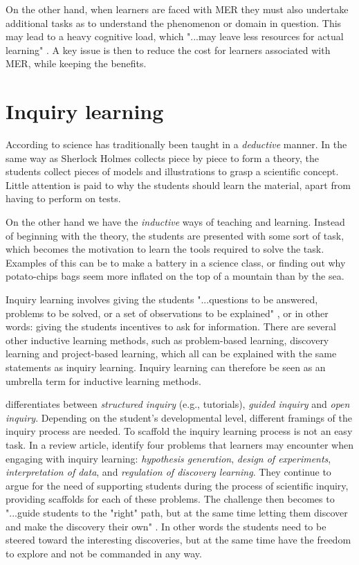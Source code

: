 On the other hand, when learners are faced with MER they must also undertake additional tasks as to understand the phenomenon or domain in question. This may lead to a heavy cognitive load, which "...may leave less resources for actual learning" \citetext{\citealp{sweller1988cognitive,sweller1989cognitive}, referenced in \citealp{van2006supporting}}. A key issue is then to reduce the cost for learners associated with MER, while keeping the benefits. 

\section{Inquiry learning}
According to \citet{prince2006inductive} science has traditionally been taught in a \textit{deductive} manner. In the same way as Sherlock Holmes collects piece by piece to form a theory, the students collect pieces of models and illustrations to grasp a scientific concept. Little attention is paid to why the students should learn the material, apart from having to perform on tests.

On the other hand we have the \textit{inductive} ways of teaching and learning. Instead of beginning with the theory, the students are presented with some sort of task, which becomes the motivation to learn the tools required to solve the task. Examples of this can be to make a battery in a science class, or finding out why potato-chips bags seem more inflated on the top of a mountain than by the sea.

Inquiry learning involves giving the students "...questions to be answered, problems to be solved, or a set of observations to be explained" \citep{prince2006inductive}, or in other words: giving the students incentives to ask for information. There are several other inductive learning methods, such as problem-based learning, discovery learning and project-based learning, which all can be explained with the same statements as inquiry learning. Inquiry learning can therefore be seen as an umbrella term for inductive learning methods. \citep{prince2006inductive}

\citeauthor*{staver1987analysis} \citetext{\citeyear{staver1987analysis}, referenced in \citealp{prince2006inductive}} differentiates between \emph{structured inquiry} (e.g., tutorials), \emph{guided inquiry} and \emph{open inquiry}. Depending on the student's developmental level, different framings of the inquiry process are needed. To scaffold the inquiry learning process is not an easy task. In a review article, \citet{de1998scientific} identify four problems that learners may encounter when engaging with inquiry learning: \textit{hypothesis generation}, \textit{design of experiments}, \textit{interpretation of data}, and \textit{regulation of discovery learning}. They continue to argue for the need of supporting students during the process of scientific inquiry, providing scaffolds for each of these problems. The challenge then becomes to "...guide students to the "right" path, but at the
same time letting them discover and make the discovery their own" \citep[p. 247]{kluge2010simulation}. In other words the students need to be steered toward the interesting discoveries, but at the same time have the freedom to explore and not be commanded in any way.

